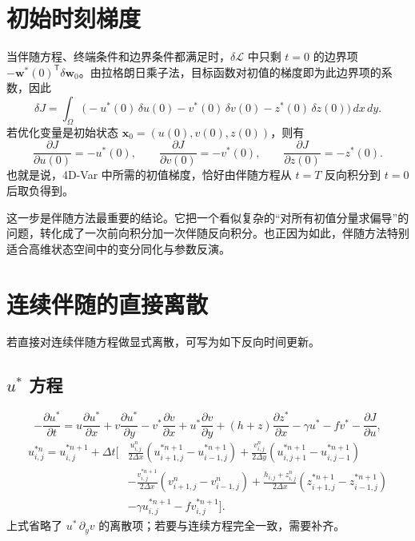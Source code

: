 \documentclass[12pt,a4paper,twoside]{article}
\begin{document}
\section{初始时刻梯度}

当伴随方程、终端条件和边界条件都满足时，$\delta \mathcal{L}$ 中只剩 $t=0$ 的边界项 $-\mathbf{w}^*(0)^{\mathsf T}\delta\mathbf{w}_0$。由拉格朗日乘子法，目标函数对初值的梯度即为此边界项的系数，因此
\[
\delta J
= \int_\Omega
\big(
- u^*(0)\,\delta u(0)
- v^*(0)\,\delta v(0)
- z^*(0)\,\delta z(0)
\big)\,dx\,dy.
\]
若优化变量是初始状态 $\mathbf{x}_0=(u(0),v(0),z(0))$，则有
\[
\frac{\partial J}{\partial u(0)} = -u^*(0), \qquad
\frac{\partial J}{\partial v(0)} = -v^*(0), \qquad
\frac{\partial J}{\partial z(0)} = -z^*(0).
\]
也就是说，4D-Var 中所需的初值梯度，恰好由伴随方程从 $t=T$ 反向积分到 $t=0$ 后取负得到。

这一步是伴随方法最重要的结论。它把一个看似复杂的“对所有初值分量求偏导”的问题，转化成了一次前向积分加一次伴随反向积分。也正因为如此，伴随方法特别适合高维状态空间中的变分同化与参数反演。

\section{连续伴随的直接离散}

若直接对连续伴随方程做显式离散，可写为如下反向时间更新。

\subsection*{$u^*$ 方程}
\[
-\frac{\partial u^*}{\partial t}
= u\frac{\partial u^*}{\partial x}
+ v\frac{\partial u^*}{\partial y}
- v^*\frac{\partial v}{\partial x}
+ u^* \frac{\partial v}{\partial y}
+ (h+z)\frac{\partial z^*}{\partial x}
- \gamma u^*
- f v^*
- \frac{\partial J}{\partial u},
\]
\begin{equation}
\begin{aligned}
u_{i,j}^{*n} = u_{i,j}^{*n+1} + \Delta t \bigg[
& \frac{u_{i,j}^n}{2\Delta x}
\left( u_{i+1,j}^{*n+1} - u_{i-1,j}^{*n+1} \right)
+ \frac{v_{i,j}^n}{2\Delta y}
\left( u_{i,j+1}^{*n+1} - u_{i,j-1}^{*n+1} \right) \\
& - \frac{v_{i,j}^{*n+1}}{2\Delta x}
\left( v_{i+1,j}^n - v_{i-1,j}^n \right)
+ \frac{h_{i,j}+z_{i,j}^n}{2\Delta x}
\left( z_{i+1,j}^{*n+1} - z_{i-1,j}^{*n+1} \right) \\
& - \gamma u_{i,j}^{*n+1}
- f v_{i,j}^{*n+1}
\bigg].
\end{aligned}
\end{equation}
上式省略了 $u^* \,\partial_y v$ 的离散项；若要与连续方程完全一致，需要补齐。
\end{document}
